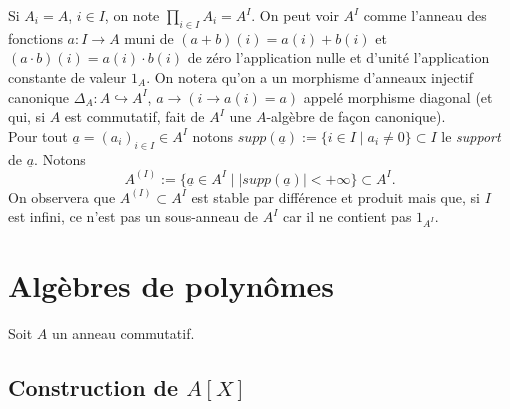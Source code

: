 Si $A_i=A$, $i\in I$, on note $\prod_{i\in I}A_i=A^I$. On peut  voir $A^I$
comme l'anneau des fonctions $a:I\rightarrow A$ muni de $(a+b)(i)=a(i)+b(i)$
et $(a\cdot b)(i)=a(i)\cdot b(i)$  de zéro l'application nulle et d'unité
l'application constante de valeur $1_A$. On notera qu'on a un morphisme
d'anneaux injectif canonique $\Delta_A:A\hookrightarrow A^I$, $a\rightarrow
(i\rightarrow a(i)=a)$ appelé morphisme diagonal (et qui, si $A$ est
commutatif,   fait de $A^I$  une $A$-algèbre de fa\c{c}on canonique).\\

Pour tout $\underline{a}=(a_i)_{i\in I}\in A^I$ notons
$supp(\underline{a}):=\lbrace i\in I\; |\; a_i\not= 0\rbrace\subset I$ le
\textit{support} de $\underline{a}$. Notons $$A^{(I)}:=\lbrace \underline{a}\in
A^I\; |\; |supp(\underline{a})|<+\infty\rbrace \subset A^I.$$ On observera que
$A^{(I)}\subset A^I$ est stable par différence et produit mais que, si $I$ est
infini, ce n'est pas un sous-anneau de $A^I$ car il ne contient pas $1_{A^I}$. 


\section{Algèbres de polynômes}\label{Poly}Soit $A$ un anneau commutatif.
\subsection{Construction de $A[X]$}


